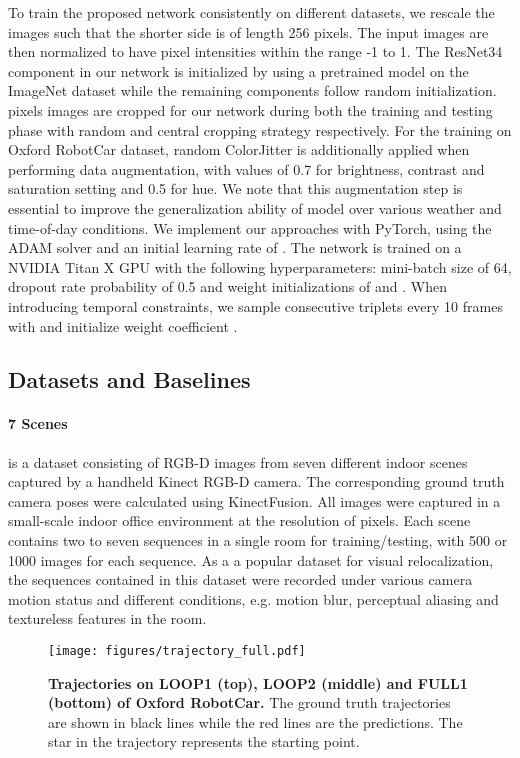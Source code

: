 \documentclass[letterpaper]{article}
\begin{document}
To train the proposed network consistently on different datasets, we rescale the images such that the shorter side is of length 256 pixels. The input images are then normalized to have  pixel intensities within the range -1 to 1. The ResNet34 \cite{he2016deep} component in our network is initialized by using a pretrained model on the ImageNet dataset while the remaining components follow random initialization.  pixels images are cropped for our network during both the training and testing phase with random and central cropping strategy respectively. For the training on Oxford RobotCar dataset, random ColorJitter is additionally applied when performing data augmentation, with values of 0.7 for brightness, contrast and saturation setting and 0.5 for hue. We note that this augmentation step is essential to improve the generalization ability of model over various weather and time-of-day conditions. We implement our approaches with PyTorch, using the ADAM solver \cite{kingma2014adam} and an initial learning rate of . The network is trained on a NVIDIA Titan X GPU with the following hyperparameters: mini-batch size of 64, dropout rate probability of 0.5 and weight initializations of  and . When introducing temporal constraints, we sample consecutive triplets every 10 frames with  and initialize weight coefficient .

\subsection{Datasets and Baselines}

\paragraph{7 Scenes} \cite{shotton2013scene}
is a dataset consisting of RGB-D images from seven different indoor scenes captured by a handheld Kinect RGB-D camera. The corresponding ground truth camera poses were calculated using KinectFusion. All images were captured in a small-scale indoor office environment at the resolution of  pixels. Each scene contains two to seven sequences in a single room for training/testing, with 500 or 1000 images for each sequence. As a a popular dataset for visual relocalization, the sequences contained in this dataset were recorded under various camera motion status and different conditions, e.g. motion blur, perceptual aliasing and textureless features in the room.
\begin{figure*}[t]
    \centering
    \texttt{[image: figures/trajectory\_full.pdf]}
\caption{\textbf{Trajectories on LOOP1 (top), LOOP2 (middle) and FULL1 (bottom) of Oxford RobotCar.} The ground truth trajectories are shown in black lines while the red lines are the predictions. The star in the trajectory represents the starting point.}
    \label{fig:Trajectory}
    \vspace{-0.5cm}
\end{figure*}
\end{document}
